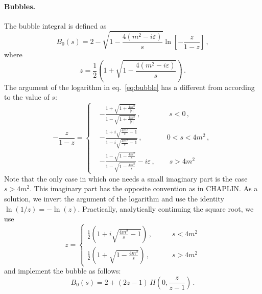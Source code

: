 \documentclass[12pt,a4wide]{article}
\begin{document}
\paragraph{Bubbles.} The bubble integral is defined as
\begin{equation}
  \label{eq:bubble}
  B_0(s)=2 -\sqrt{1-\frac{4(m^2-i\varepsilon)}{s}}\ln\left[-\frac{z}{1-z}\right]\,,
\end{equation}
where 
\begin{equation}
  \label{eq:z}
  z=\frac{1}{2}\left(1+\sqrt{1-\frac{4(m^2-i\varepsilon)}{s}}\right)\,.
\end{equation}
The argument of the logarithm in eq.~\eqref{eq:bubble} has a different
from according to the value of $s$:
\begin{equation}
  \label{eq:z-omz}
  -\frac{z}{1-z} = \left\{
    \begin{split}
      &-\frac{1+\sqrt{1+\frac{4m^2}{|s|}}}{1-\sqrt{1+\frac{4m^2}{|s|}}}\,,\qquad \qquad s<0\,,\\
        & -\frac{1+i\sqrt{\frac{4m^2}{s}-1}}{1-i\sqrt{\frac{4m^2}{s}-1}}\,,\qquad \quad\>\> 0<s<4m^2\,,\\
        &
        -\frac{1-\sqrt{1-\frac{4m^2}{s}}}{1-\sqrt{1-\frac{4m^2}{s}}}-i\varepsilon\,,\qquad
        s>4m^2
    \end{split}
\right.
\end{equation}
Note that the only case in which one needs a small imaginary part is
the case $s>4m^2$. This imaginary part has the opposite convention as
in CHAPLIN. As a solution, we invert the argument of the logarithm and
use the identity $\ln(1/z)=-\ln(z)$. Practically, analytically
continuing the square root, we use
\begin{equation}
  \label{eq:z-implemented}
  z = \left\{\begin{split}
      \frac{1}{2}\left(1+i\sqrt{\frac{4m^2}{s}-1}\right)\,,& \qquad s< 4m^2\\
      \frac{1}{2}\left(1+\sqrt{1-\frac{4m^2}{s}}\right)\,,& \qquad s> 4m^2
    \end{split}
    \right.
  \end{equation}
and implement the bubble as follows:
\begin{equation}
  \label{eq:bubble-implemented}
  B_0(s)=
    2 +(2 z-1) \,H\left(0,\frac{z}{z-1}\right) \,.
\end{equation}

 
\end{document}
